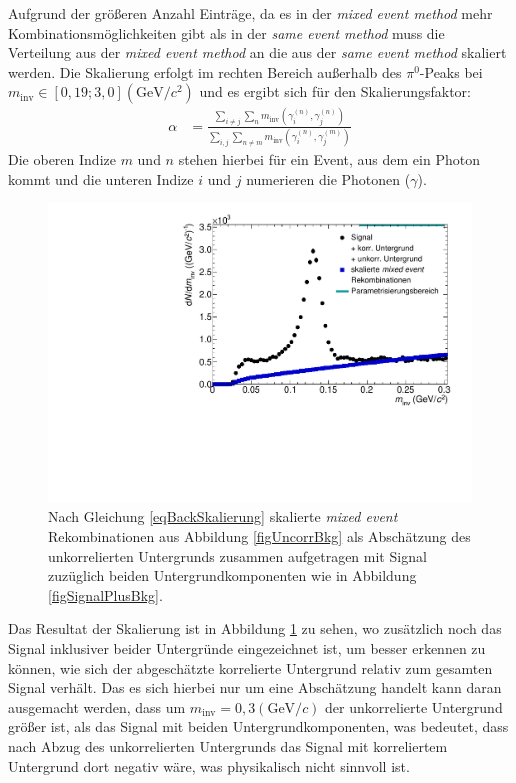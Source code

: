 Aufgrund der gr{\"o}{\ss}eren Anzahl Eintr{\"a}ge, da es in der \textit{mixed event method} mehr Kombinationsm\"oglichkeiten gibt als in der \textit{same event method} muss die Verteilung aus der \textit{mixed event method} an die aus der \textit{same event method} skaliert werden.
Die Skalierung erfolgt im rechten Bereich au{\ss}erhalb des $\pi^{0}$-Peaks bei $m_\text{inv} \in \left[0,19;3,0\right] (\text{GeV/}c^{2})$ und es ergibt sich f{\"u}r den Skalierungsfaktor:
\begin{align}
\label{eqBackSkalierung}
\alpha &= \frac{\sum_{i \neq j}\sum_{n}m_{\text{inv}}\left( \gamma^{(n)}_{i},\gamma^{(n)}_{j}\right) }{\sum_{i,j}\sum_{n \neq m}m_{\text{inv}}\left( \gamma^{(n)}_{i},\gamma^{(m)}_{j}\right) }
\end{align}
Die oberen Indize $m$ und $n$ stehen hierbei f{\"u}r ein Event, aus dem ein Photon kommt und die unteren Indize $i$ und $j$ numerieren die Photonen ($\gamma$).
\begin{figure}[thp]
\centering
\includegraphics[width=.75\linewidth]{hUncorrBkgNorm.pdf}
\caption{Nach Gleichung \ref{eqBackSkalierung} skalierte {\it mixed event} Rekombinationen aus Abbildung \ref{figUncorrBkg} als Absch{\"a}tzung des unkorrelierten Untergrunds zusammen aufgetragen mit Signal zuz{\"u}glich beiden Untergrundkomponenten wie in Abbildung \ref{figSignalPlusBkg}.}
\label{figUncorrBkgNorm}
\end{figure}
\newline
Das Resultat der Skalierung ist in Abbildung \ref{figUncorrBkgNorm} zu sehen, wo zus{\"a}tzlich noch das Signal inklusiver beider Untergr{\"u}nde eingezeichnet ist, um besser erkennen zu k{\"o}nnen, wie sich der abgesch{\"a}tzte korrelierte Untergrund relativ zum gesamten Signal verh{\"a}lt.
Das es sich hierbei nur um eine Absch{\"a}tzung handelt kann daran ausgemacht werden, dass um $m_{\text{inv}} = 0,3 (\text{GeV/}c)$ der unkorrelierte Untergrund gr{\"o}{\ss}er ist, als das Signal mit beiden Untergrundkomponenten, was bedeutet, dass nach Abzug des unkorrelierten Untergrunds das Signal mit korreliertem Untergrund dort negativ w{\"a}re, was physikalisch nicht sinnvoll ist.
